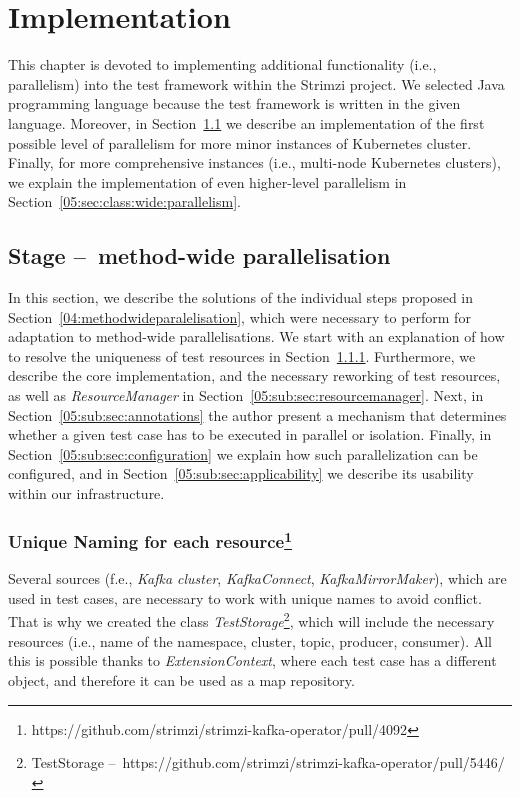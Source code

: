 \chapter{Implementation}
\label{05:chapter:title}

This chapter is devoted to implementing additional functionality (i.e., parallelism) into the test framework within the Strimzi project.
We selected Java programming language because the test framework is written in the given language.
Moreover, in Section~\ref{05:sec:method:wide:parallelism} we describe an implementation of the first possible level of parallelism for more minor instances of Kubernetes cluster.
Finally, for more comprehensive instances (i.e., multi-node Kubernetes clusters), we explain the implementation of even higher-level parallelism in Section~\ref{05:sec:class:wide:parallelism}.

\section{Stage \---\ method-wide parallelisation}
\label{05:sec:method:wide:parallelism}

In this section, we describe the solutions of the individual steps proposed in Section~\ref{04:methodwideparalelisation},
which were necessary to perform for adaptation to method-wide parallelisations.
We start with an explanation of how to resolve the uniqueness of test resources in Section~\ref{05:sub:sec:unique}.
Furthermore, we describe the core implementation, and the necessary reworking of test resources, as well as \emph{ResourceManager} in Section~\ref{05:sub:sec:resourcemanager}.
Next, in Section~\ref{05:sub:sec:annotations} the author present a mechanism that determines whether a given test case has to be executed in parallel or isolation.
Finally, in Section~\ref{05:sub:sec:configuration} we explain how such parallelization can be configured,
and in Section~\ref{05:sub:sec:applicability} we describe its usability within our infrastructure.

\subsection{Unique Naming for each resource\protect\footnote{https://github.com/strimzi/strimzi-kafka-operator/pull/4092}}
\label{05:sub:sec:unique}

Several sources (f.e., \emph{Kafka cluster}, \emph{KafkaConnect}, \emph{KafkaMirrorMaker}), which are used in test cases,
are necessary to work with unique names to avoid conflict.
That is why we created the class \emph{TestStorage}\footnote{TestStorage \---\ https://github.com/strimzi/strimzi-kafka-operator/pull/5446/}, which will include the necessary resources (i.e., name of the namespace, cluster, topic, producer, consumer).
All this is possible thanks to \emph{ExtensionContext}, where each test case has a different object, and therefore it can be used as a map repository.

